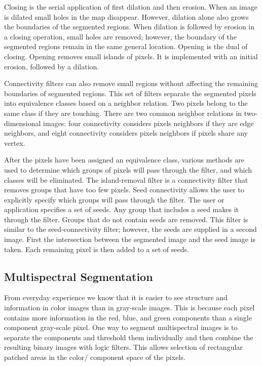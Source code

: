 Closing is the serial application of first dilation and then erosion. When an image is dilated small holes in the map disappear. However, dilation alone also grows the boundaries of the segmented regions. When dilation is followed by erosion in a closing operation, small holes are removed; however, the boundary of the segmented regions remain in the same general location. Opening is the dual of closing. Opening removes small islands of pixels. It is implemented with an initial erosion, followed by a dilation.

Connectivity filters can also remove small regions without affecting the remaining boundaries of segmented regions. This set of filters separate the segmented pixels into equivalence classes based on a neighbor relation. Two pixels belong to the same class if they are touching. There are two common neighbor relations in two-dimensional images: four connectivity considers pixels neighbors if they are edge neighbors, and eight connectivity considers pixels neighbors if pixels share any vertex.

After the pixels have been assigned an equivalence class, various methods are used to determine which groups of pixels will pass through the filter, and which classes will be eliminated. The island-removal filter is a connectivity filter that removes groups that have too few pixels. Seed connectivity allows the user to explicitly specify which groups will pass through the filter. The user or application specifies a set of seeds. Any group that includes a seed makes it through the filter. Groups that do not contain seeds are removed. This filter is similar to the seed-connectivity filter; however, the seeds are supplied in a second image. First the intersection between the segmented image and the seed image is taken. Each remaining pixel is then added to a set of seeds.

\subsection{Multispectral Segmentation}

From everyday experience we know that it is easier to see structure and information in color images than in gray-scale images. This is because each pixel contains more information in the red, blue, and green components than a single component gray-scale pixel. One way to segment multispectral images is to separate the components and threshold them individually and then combine the resulting binary images with logic filters. This allows selection of rectangular patched areas in the color/ component space of the pixels.

